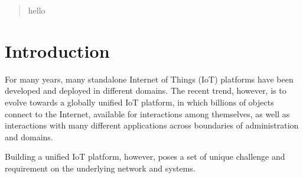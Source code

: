 \begin{abstract}
hello
\end{abstract}

\section{Introduction}
For many years, many standalone Internet of Things (IoT) platforms have been developed and deployed in different domains. The recent trend, however, is to evolve towards a globally unified IoT platform, in which billions of objects connect to the Internet, available for interactions among themselves, as well as interactions with many different applications across boundaries of administration and domains. 


Building a unified IoT platform, however, poses a set of unique challenge and requirement on the underlying network and systems.
\vspace{1mm}
\vspace{1mm}
\vspace{1mm}
\vspace{1mm}
